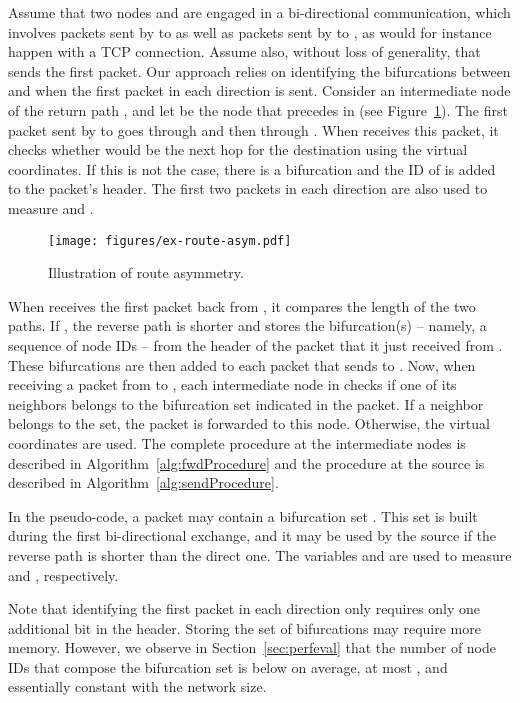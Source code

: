 \documentclass[conference]{IEEEtran}
\begin{document}
Assume that two nodes  and  are engaged in a bi-directional communication, which involves packets sent by  to  as well as packets sent by  to , as would for instance happen with a TCP connection.
Assume also, without loss of generality, that  sends the first packet.
Our approach relies on identifying the bifurcations between  and  when the first packet in each direction is sent.
Consider an intermediate node  of the return path , and let  be the node that precedes  in  (see Figure~\ref{fig:ex-asym}). The first packet sent by  to  goes through  and then through . When  receives this packet, it checks whether  would be the next hop for the destination  using the virtual coordinates. If this is not the case, there is a bifurcation and the ID of  is added to the packet's header. The first two packets in each direction are also used to measure  and .

\begin{figure}
\centering
\texttt{[image: figures/ex-route-asym.pdf]}\caption{Illustration of route asymmetry.}
\label{fig:ex-asym}
\end{figure}

When  receives the first packet back from , it compares the length of the two paths. If , the reverse path is shorter and  stores the bifurcation(s) -- namely, a sequence of node IDs -- from the header of the packet that it just received from . These bifurcations are then added to each packet that  sends to . Now, when receiving a packet from  to , each intermediate node in  checks if one of its neighbors belongs to the bifurcation set indicated in the packet. If a neighbor belongs to the set, the packet is forwarded to this node. Otherwise, the virtual coordinates are used. The complete procedure at the intermediate nodes is described in Algorithm~\ref{alg:fwdProcedure} and the procedure at the source  is described in Algorithm~\ref{alg:sendProcedure}.

In the pseudo-code, a packet  may contain a bifurcation set . This set is built during the first bi-directional exchange, and it may be used by the source  if the reverse path is shorter than the direct one. The variables  and  are used to measure  and , respectively. 

Note that identifying the first packet in each direction only requires only one additional bit in the header. Storing the set of bifurcations may require more memory. However, we observe in Section~\ref{sec:perfeval} that the number of node IDs that compose the bifurcation set is below  on average, at most , and essentially constant with the network size.
\end{document}

